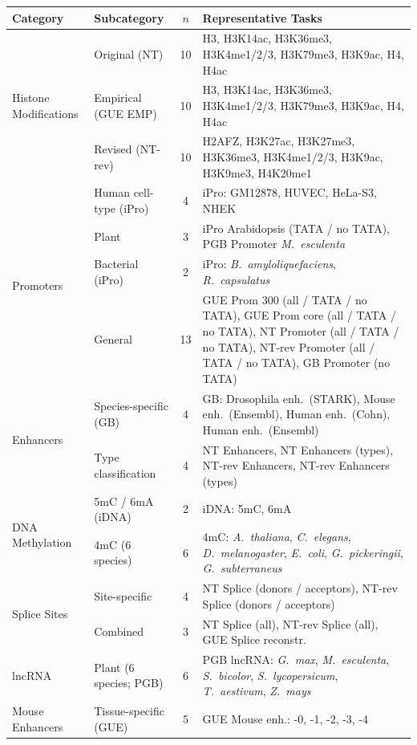 \documentclass{llmxive}
\begin{document}
\begin{table}[h]
\centering
\small
\begin{tabular}{@{}llcp{9.5cm}@{}}
\toprule
\textbf{Category} & \textbf{Subcategory} & \textbf{$n$} & \textbf{Representative Tasks} \\
\midrule
\multirow{3}{*}{Histone Modifications} & Original (NT) & 10 & H3, H3K14ac, H3K36me3, H3K4me1/2/3, H3K79me3, H3K9ac, H4, H4ac \\
& Empirical (GUE EMP) & 10 & H3, H3K14ac, H3K36me3, H3K4me1/2/3, H3K79me3, H3K9ac, H4, H4ac \\
& Revised (NT-rev) & 10 & H2AFZ, H3K27ac, H3K27me3, H3K36me3, H3K4me1/2/3, H3K9ac, H3K9me3, H4K20me1 \\
\midrule
\multirow{4}{*}{Promoters} & Human cell-type (iPro) & 4 & iPro: GM12878, HUVEC, HeLa-S3, NHEK \\
 & Plant & 3 & iPro Arabidopsis (TATA / no TATA), PGB Promoter \emph{M.\ esculenta} \\
 & Bacterial (iPro) & 2 & iPro: \emph{B.\ amyloliquefaciens}, \emph{R.\ capsulatus} \\
 & General & 13 & GUE Prom 300 (all / TATA / no TATA), GUE Prom core (all / TATA / no TATA), NT Promoter (all / TATA / no TATA), NT-rev Promoter (all / TATA / no TATA), GB Promoter (no TATA) \\
\midrule
\multirow{2}{*}{Enhancers} & Species-specific (GB) & 4 & GB: Drosophila enh.\ (STARK), Mouse enh.\ (Ensembl), Human enh.\ (Cohn), Human enh.\ (Ensembl) \\
 & Type classification & 4 & NT Enhancers, NT Enhancers (types), NT-rev Enhancers, NT-rev Enhancers (types) \\
\midrule
\multirow{2}{*}{DNA Methylation} & 5mC / 6mA (iDNA) & 2 & iDNA: 5mC, 6mA \\
 & 4mC (6 species) & 6 & 4mC: \emph{A.\ thaliana}, \emph{C.\ elegans}, \emph{D.\ melanogaster}, \emph{E.\ coli}, \emph{G.\ pickeringii}, \emph{G.\ subterraneus} \\
\midrule
\multirow{2}{*}{Splice Sites} & Site-specific & 4 & NT Splice (donors / acceptors), NT-rev Splice (donors / acceptors) \\
 & Combined & 3 & NT Splice (all), NT-rev Splice (all), GUE Splice reconstr. \\
\midrule
lncRNA & Plant (6 species; PGB) & 6 & PGB lncRNA: \emph{G.\ max}, \emph{M.\ esculenta}, \emph{S.\ bicolor}, \emph{S.\ lycopersicum}, \emph{T.\ aestivum}, \emph{Z.\ mays} \\
\midrule
Mouse Enhancers & Tissue-specific (GUE) & 5 & GUE Mouse enh.: -0, -1, -2, -3, -4 \\

\end{tabular}
\end{table}
\end{document}
